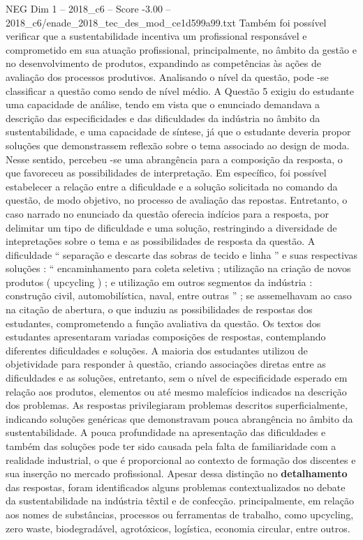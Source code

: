 \begin{textsample}{NEG Dim 1 – 2018\_c6 – Score -3.00 – 2018\_c6/enade\_2018\_tec\_des\_mod\_ce1d599a99.txt}
Também foi possível verificar que a sustentabilidade incentiva um profissional responsável e comprometido em sua atuação profissional, principalmente, no âmbito da gestão e no desenvolvimento de produtos, expandindo as competências às ações de avaliação dos processos produtivos.
Analisando o nível da questão, pode -se classificar a questão como sendo de nível médio.
A Questão 5 exigiu do estudante uma capacidade de análise, tendo em vista que o enunciado demandava a descrição das especificidades e das dificuldades da indústria no âmbito da sustentabilidade, e uma capacidade de síntese, já que o estudante deveria propor soluções que demonstrassem reflexão sobre o tema associado ao design de moda.
Nesse sentido, percebeu -se uma abrangência para a composição da resposta, o que favoreceu as possibilidades de interpretação.
Em específico, foi possível estabelecer a relação entre a dificuldade e a solução solicitada no comando da questão, de modo objetivo, no processo de avaliação das repostas.
Entretanto, o caso narrado no enunciado da questão oferecia indícios para a resposta, por delimitar um tipo de dificuldade e uma solução, restringindo a diversidade de intepretações sobre o tema e as possibilidades de resposta da questão.
A dificuldade “ separação e descarte das sobras de tecido e linha ” e suas respectivas soluções : “ encaminhamento para coleta seletiva ; utilização na criação de novos produtos ( upcycling ) ; e utilização em outros segmentos da indústria : construção civil, automobilística, naval, entre outras ” ; se assemelhavam ao caso na citação de abertura, o que induziu as possibilidades de respostas dos estudantes, comprometendo a função avaliativa da questão.
Os textos dos estudantes apresentaram variadas composições de respostas, contemplando diferentes dificuldades e soluções.
A maioria dos estudantes utilizou de objetividade para responder à questão, criando associações diretas entre as dificuldades e as soluções, entretanto, sem o nível de especificidade esperado em relação aos produtos, elementos ou até mesmo malefícios indicados na descrição dos problemas.
As respostas privilegiaram problemas descritos superficialmente, indicando soluções genéricas que demonstravam pouca abrangência no âmbito da sustentabilidade.
A pouca profundidade na apresentação das dificuldades e também das soluções pode ter sido causada pela falta de familiaridade com a realidade industrial, o que é proporcional ao contexto de formação dos discentes e sua inserção no mercado profissional.
Apesar dessa distinção no \textbf{detalhamento} das respostas, foram identificados alguns problemas contextualizados no debate da sustentabilidade na indústria têxtil e de confecção. principalmente, em relação aos nomes de substâncias, processos ou ferramentas de trabalho, como upcycling, zero waste, biodegradável, agrotóxicos, logística, economia circular, entre outros.

\end{textsample}
